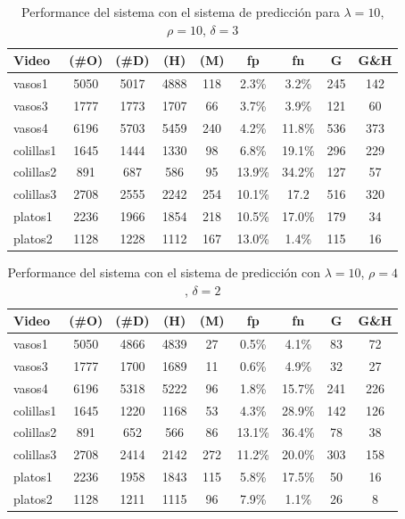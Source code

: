 \begin{table}[htb]
  \begin{tabular}{|l | c | c | c | c | c | c | c | c |}
	\hline  
	\textbf{Video} & \textbf{(\#O)} &  \textbf{(\#D)} & \textbf{(H)} & \textbf{(M)} & \textbf{fp} & \textbf{fn} & \textbf{G} & \textbf{G\&H} \\
	\hline
	\hline
	vasos1 & 5050 & 5017 & 4888 & 118 & 2.3\% & 3.2\%  & 245 & 142\\
	vasos3 & 1777 & 1773 & 1707 & 66 & 3.7\% & 3.9\% & 121 & 60 \\
	vasos4 & 6196 & 5703 & 5459 & 240 & 4.2\% & 11.8\% & 536 & 373 \\
	\hline
	colillas1 & 1645 & 1444 & 1330 & 98 & 6.8\% & 19.1\% & 296 & 229 \\
	colillas2 & 891 & 687 & 586 & 95 & 13.9\% & 34.2\% & 127 & 57 \\
	colillas3 & 2708 & 2555 & 2242 & 254 & 10.1\% & 17.2  & 516 & 320\\
	\hline
	platos1 & 2236 & 1966 & 1854 & 218 & 10.5\% & 17.0\% & 179 & 34\\
	platos2 & 1128 & 1228 & 1112 & 167& 13.0\% & 1.4\% & 115 & 16\\
	\hline
	\end{tabular}
	\caption{\label{tab:pred} Performance del sistema con el sistema de predicción para 
	$\lambda=10$, $\rho=10$, $\delta=3$ }
\end{table}

\begin{table}[htb]
  \begin{tabular}{|l | c | c | c | c | c | c | c | c |}
	\hline  
	\textbf{Video} & \textbf{(\#O)} &  \textbf{(\#D)} & \textbf{(H)} & \textbf{(M)} & \textbf{fp} & \textbf{fn} & \textbf{G} & \textbf{G\&H} \\
	\hline
	\hline
	vasos1 & 5050 & 4866 & 4839 & 27 & 0.5\% & 4.1\%  & 83 & 72\\
	vasos3 & 1777 & 1700 & 1689 & 11 & 0.6\% & 4.9\% & 32 & 27 \\
	vasos4 & 6196 & 5318 & 5222 & 96 & 1.8\% & 15.7\% & 241 & 226 \\
	\hline
	colillas1 & 1645 & 1220 & 1168 & 53 & 4.3\% & 28.9\% & 142 & 126 \\
	colillas2 & 891 & 652 & 566 & 86 & 13.1\% & 36.4\% & 78 & 38 \\
	colillas3 & 2708 & 2414 & 2142 & 272 & 11.2\% & 20.0\% & 303 & 158 \\
	\hline
	platos1 & 2236 & 1958 & 1843 & 115 & 5.8\% & 17.5\% & 50 & 16 \\
	platos2 & 1128 & 1211 & 1115 & 96 & 7.9\% & 1.1\% & 26 & 8 \\
	\hline
	\end{tabular}
	\caption{\label{tab:pred_2} Performance del sistema con el sistema de predicción con
	$\lambda=10$, $\rho=4$, $\delta=2$}
\end{table}

